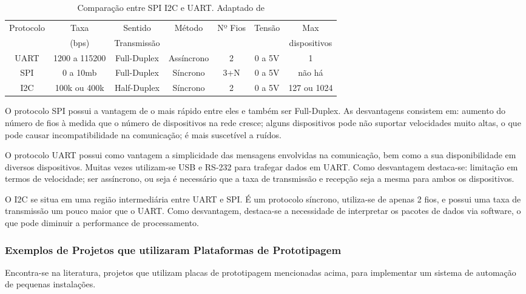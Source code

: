 		\begin{table}[!htb]
			\centering
			\captionsetup{justification=centering}
			\caption[Comparação entre SPI I2C e UART.]{Comparação entre SPI I2C e UART. Adaptado de \textcite{robocore}}
			\label{tbl:comparativo_protocolos}
			\def\arraystretch{1.5}
			\begin{tabular}{c c c c c c c}
				Protocolo & Taxa & Sentido & Método & Nº Fios & Tensão & Max \\ 
				& (bps)& Transmissão & & & & dispositivos \\ \hline
				UART & 1200 a 115200 & Full-Duplex & Assíncrono & 2 & 0 a 5V & 1 \\
				SPI & 0 a 10mb & Full-Duplex & Síncrono & 3+N & 0 a 5V & não há \\
				I2C & 100k ou 400k & Half-Duplex & Síncrono & 2 & 0 a 5V & 127 ou 1024 \\
				\hline
			\end{tabular}
		\end{table}
	
		O protocolo SPI possui  a vantagem de o mais rápido entre eles e também ser Full-Duplex. As desvantagens consistem em: aumento do número de fios à medida que o número de dispositivos na rede cresce; alguns dispositivos pode não suportar velocidades muito altas, o que pode causar incompatibilidade na comunicação; é mais suscetível a ruídos.
		
		O protocolo UART possui como vantagem a simplicidade das mensagens envolvidas na comunicação, bem como a sua disponibilidade em diversos dispositivos. Muitas vezes utilizam-se USB e RS-232 para trafegar dados em UART. Como desvantagem destaca-se: limitação em termos de velocidade; ser assíncrono, ou seja é necessário que a taxa de transmissão e recepção seja a mesma para ambos os dispositivos.
		
		O I2C se situa em uma região intermediária entre UART e SPI. É um protocolo síncrono, utiliza-se de apenas 2 fios, e possui uma taxa de transmissão um pouco maior que o UART. Como desvantagem, destaca-se a necessidade de interpretar os pacotes de dados via software, o que pode diminuir a performance de processamento.
		
		\subsubsection{Exemplos de Projetos que utilizaram Plataformas de Prototipagem}
			\label{sec:exemplos}
			Encontra-se na literatura, projetos que utilizam placas de prototipagem mencionadas acima, para implementar um sistema de automação de pequenas instalações.
			
